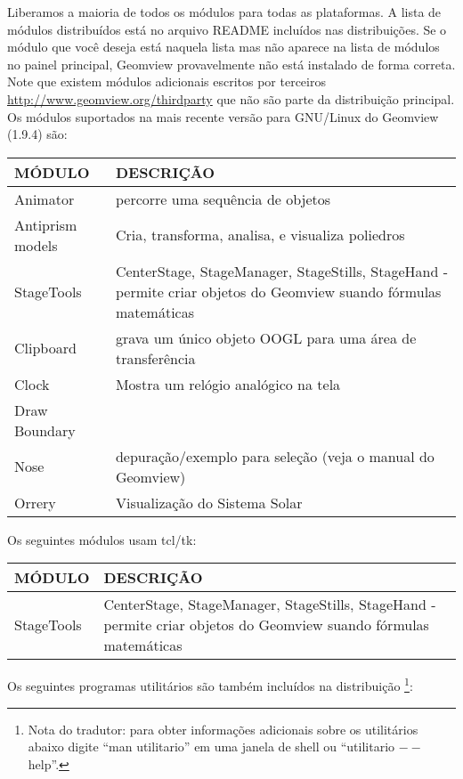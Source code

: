 \documentclass[12pt,a4paper]{article}
\begin{document}
        Liberamos a maioria de todos os m\'{o}dulos para todas as plataformas. A lista de
        m\'{o}dulos distribu\'idos est\'a no arquivo README inclu\'idos nas distribui\c{c}\~oes.
        Se o m\'{o}dulo que voc\^e deseja est\'a naquela lista mas n\~ao aparece na lista de
        m\'{o}dulos no painel principal, Geomview provavelmente n\~ao est\'a instalado de forma correta. Note
        que existem m\'{o}dulos adicionais escritos por terceiros
        \url{http://www.geomview.org/thirdparty} que n\~ao s\~ao parte da distribui\c{c}\~ao
        principal. Os m\'{o}dulos suportados na mais recente vers\~ao para GNU/Linux do
        Geomview (1.9.4) s\~ao:
        \begin{center}
        \begin{tabular}{|l|p{8cm}|}
        \\ \hline
        M\'ODULO & DESCRI\c{C}\~AO  \\ \hline
        Animator & percorre uma sequ\^encia de objetos  \\ \hline
        Antiprism models & Cria, transforma, analisa, e visualiza poliedros \\ \hline
        StageTools & CenterStage, StageManager, StageStills, StageHand - permite criar objetos do Geomview suando f\'{o}rmulas matem\'aticas  \\ \hline
        Clipboard & grava um \'unico objeto OOGL para uma \'area de transfer\^encia  \\ \hline
        Clock & Mostra um rel\'{o}gio anal\'{o}gico na tela  \\ \hline
        Draw Boundary &  \\ \hline
        Nose & depura\c{c}\~ao/exemplo para sele\c{c}\~ao (veja o manual do Geomview)  \\ \hline
        Orrery & Visualiza\c{c}\~ao do Sistema Solar  \\ \hline
        \end{tabular}
	\end{center}
        Os seguintes m\'{o}dulos usam tcl/tk:
        \begin{center}
        \begin{tabular}{|l|p{8cm}|}
        \\ \hline
        M\'ODULO & DESCRI\c{C}\~AO  \\ \hline
        StageTools & CenterStage, StageManager, StageStills, StageHand - permite criar objetos do Geomview suando f\'{o}rmulas matem\'aticas  \\ \hline
        \end{tabular}
	\end{center}
        Os seguintes programas utilit\'arios s\~ao tamb\'em inclu\'idos na distribui\c{c}\~ao
        \footnote{Nota do tradutor: para obter informa\c{c}\~oes adicionais sobre os utilit\'arios abaixo digite
        ``man utilitario'' em uma janela de shell ou ``utilitario $--$help''.}:
	
\end{document}
